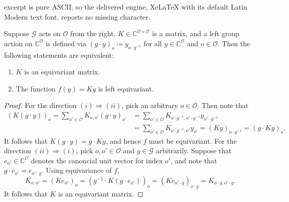 \documentclass[10pt,a4paper]{amsart}
\newcommand\Gc{\mathcal G}
\newcommand\Oc{\mathcal O}
\newcommand{\C}{\mathbb{C}}
\begin{document}
excerpt is pure ASCII, so the delivered engine, XeLaTeX with its default Latin Modern text font, reports no missing character.
\begin{lemma}
    \label{thr:equivariant-matrices}
    Suppose $\Gc$ acts on $\Oc$ from the right, $K \in \C^{\Oc \times \Oc}$ is a matrix, and a left group action on $\C^\Oc$ is defined via $(g \cdot y)_o \coloneqq y_{o \cdot g^{-1}}$ for all $y \in \C^\Oc$ and $o \in \Oc$. Then the following statements are equivalent:  %
    \begin{enumerate}[noitemsep]
        \item[(i)] $K$ is an equivariant matrix.
        \item[(ii)] The function $f(y) = K y$ is left equivariant.
    \end{enumerate}
\end{lemma}

\begin{proof}
    For the direction $(i) \Rightarrow (ii)$,  pick an arbitrary $o \in \Oc$. Then note that
    \begin{align*}
        ( K (g\cdot y) )_o
        = \sum_{o' \in \Oc} K_{o,o'} (g \cdot y)_{o'}
        &= \sum_{o' \in \Oc} K_{o \cdot g^{-1}, o' \cdot g^{-1}} y_{o' \cdot g^{-1}} \\
        &= \sum_{o' \in \Oc} K_{o \cdot g^{-1}, o'} y_{o'}
        = ( K y)_{o \cdot g^{-1}} = (g \cdot K y)_o.
    \end{align*} 
    It follows that $K (g \cdot y) = g \cdot K y$, and hence $f$ must be equivariant. For the direction $(ii) \Rightarrow (i)$, pick $o,o' \in \Oc$ and $g \in \Gc$ arbitrarily. Suppose that $e_{o'} \in \C^\Oc$ denotes the canoncial unit vector for index $o'$, and note that $g \cdot e_{o'} = e_{o' \cdot g}$. Using equivariance of $f$,
    $$
        K_{o,o'}  
        = (K e_{o'})_o 
        = (g^{-1} \cdot K (g \cdot e_{o'}))_{o}
        = (K e_{o' \cdot g})_{o \cdot g}
        = K_{o\cdot g, o' \cdot g}.
    $$
    It follows that $K$ is an equivariant matrix.
\end{proof}
\end{document}
